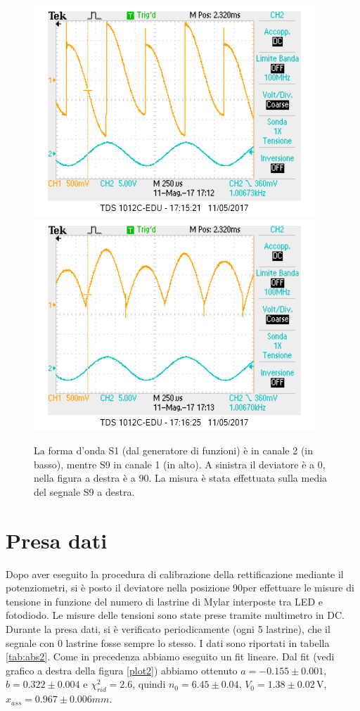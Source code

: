 \documentclass[10pt,a4paper]{article}
\begin{document}
\begin{figure}[!htb]
  \centering
  \includegraphics[scale=0.45]{dev0ch1S9-ch2S1(zero).png}\includegraphics[scale=0.45]{dev90ch1S9-ch2S1(zero).png}
\caption{La forma d'onda S1 (dal generatore di funzioni) è in canale 2 (in basso), mentre S9 in canale 1 (in alto). A sinistra il deviatore è a 0\degree, nella figura a destra è a 90\degree. La misura è stata effettuata sulla media del segnale S9 a destra. \label{osc:S9(zero)}}
\end{figure}

\section{Presa dati}
Dopo aver eseguito la procedura di calibrazione della rettificazione mediante il potenziometri, si è posto il deviatore nella posizione 90\degree per effettuare le misure di tensione in funzione del numero di lastrine di Mylar interposte tra LED e fotodiodo.
Le misure delle tensioni sono state prese tramite multimetro in DC. Durante la presa dati, si è verificato periodicamente (ogni 5 lastrine), che il segnale con 0 lastrine fosse sempre lo stesso. I dati sono riportati in tabella \ref{tab:abs2}. Come in precedenza abbiamo eseguito un fit lineare.
Dal fit (vedi grafico a destra della figura \ref{plot2}) abbiamo ottenuto $a=-0.155\pm0.001$, $b=0.322\pm0.004$ e $\chi^2_{rid}=2.6$, quindi $n_0= 6.45\pm 0.04$, $V_0=1.38\pm0.02\,\mbox{V}$, $x_{ass}=0.967\pm0.006{mm}$.
\end{document}
